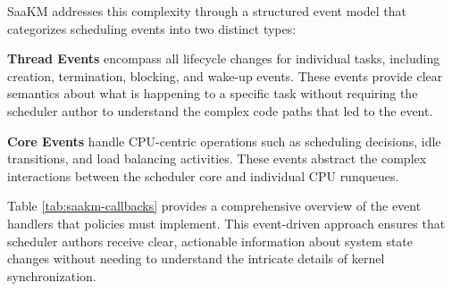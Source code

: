 \parspace
SaaKM addresses this complexity through a structured event model that categorizes scheduling events into two distinct types:

\parspace
\textbf{Thread Events} encompass all lifecycle changes for individual tasks, including creation, termination, blocking, and wake-up events. These events provide clear semantics about what is happening to a specific task without requiring the scheduler author to understand the complex code paths that led to the event.

\parspace
\textbf{Core Events} handle CPU-centric operations such as scheduling decisions, idle transitions, and load balancing activities. These events abstract the complex interactions between the scheduler core and individual CPU runqueues.

\parspace
Table \ref{tab:saakm-callbacks} provides a comprehensive overview of the event handlers that policies must implement. This event-driven approach ensures that scheduler authors receive clear, actionable information about system state changes without needing to understand the intricate details of kernel synchronization.

